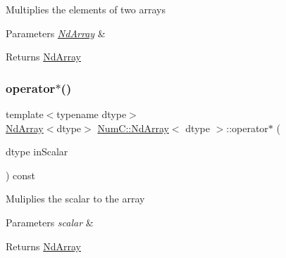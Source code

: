 Multiplies the elements of two arrays


\begin{DoxyParams}{Parameters}
{\em \mbox{\hyperlink{class_num_c_1_1_nd_array}{Nd\+Array}}} & \\
\hline
\end{DoxyParams}
\begin{DoxyReturn}{Returns}
\mbox{\hyperlink{class_num_c_1_1_nd_array}{Nd\+Array}} 
\end{DoxyReturn}
\mbox{\label{class_num_c_1_1_nd_array_acc8e2a1e0ed7f63df71b4e1137bd0edd}} 
\subsubsection{\texorpdfstring{operator$\ast$()}{operator*()}\hspace{0.1cm}{\footnotesize\ttfamily [2/2]}}
{\footnotesize\ttfamily template$<$typename dtype$>$ \\
\mbox{\hyperlink{class_num_c_1_1_nd_array}{Nd\+Array}}$<$dtype$>$ \mbox{\hyperlink{class_num_c_1_1_nd_array}{Num\+C\+::\+Nd\+Array}}$<$ dtype $>$\+::operator$\ast$ (\begin{DoxyParamCaption}\item[{dtype}]{in\+Scalar }\end{DoxyParamCaption}) const\hspace{0.3cm}{\ttfamily [inline]}}

Muliplies the scalar to the array


\begin{DoxyParams}{Parameters}
{\em scalar} & \\
\hline
\end{DoxyParams}
\begin{DoxyReturn}{Returns}
\mbox{\hyperlink{class_num_c_1_1_nd_array}{Nd\+Array}} 
\end{DoxyReturn}
\mbox{\label{class_num_c_1_1_nd_array_ad3aafa9b18db12bf67f9f1e1795a6043}} 
